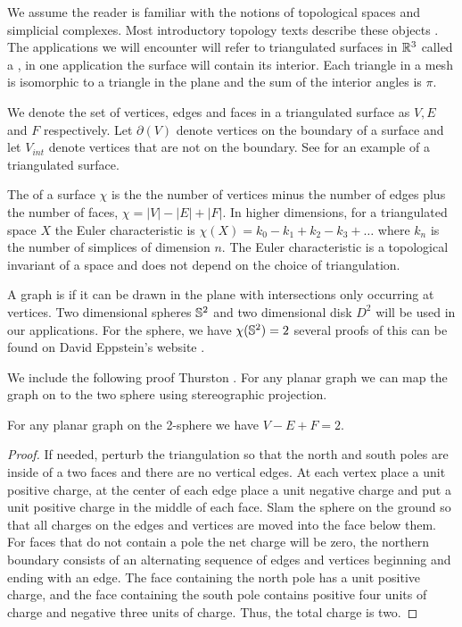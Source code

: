We assume the reader is familiar with the notions
of topological spaces and simplicial complexes.
Most introductory topology texts describe these objects \cite{jm08,munkres}.
The applications we will encounter will refer to triangulated surfaces in $\mathbb{R}^3$
called a , in one application the surface will contain its interior.
Each triangle in a mesh is isomorphic to a triangle in the plane and the sum
of the interior angles is $\pi$.


We denote the set of vertices, edges and faces in a triangulated surface as 
$V, E$ and $F$ respectively.
Let $\partial(V)$ denote vertices on the boundary of a surface and let $V_{int}$ 
denote vertices that are not on the boundary.
See  for an example of a triangulated surface.



The  of a surface $\chi$ is the 
the number of vertices minus the number of edges plus  the number of faces, $\chi=|V|-|E|+|F|.$
In higher dimensions, for a triangulated space $X$ the Euler characteristic is 
$\chi(X)=k_0-k_1+k_2-k_3+\ldots$ where $k_n$ is the number of simplices of dimension $n.$
The Euler characteristic is a topological invariant of a space
and does not depend on the choice of triangulation.

A  graph  is  if it can be drawn in the plane with intersections only occurring
at vertices.
Two dimensional spheres $\mathbb{S}^2$ and two dimensional disk $D^2$ 
will be used in our applications.
For the sphere, we have $\chi(\mathbb{S}^2)=2$ 
several proofs of this can be found on David Eppstein's website \cite{eppstein-proofs}.




We include the following proof Thurston \cite{thurston}. 
For any planar graph we can map the graph on to the two sphere using stereographic projection.
 

\begin{theorem}\label{thm:euler}
For any planar graph on the 2-sphere we have $V-E+F=2.$
\end{theorem}

\begin{proof}
If needed, perturb the triangulation so that the north and south poles are 
inside of a two faces and there are no vertical edges. At each vertex place a unit positive
charge, at the center of each edge place a unit negative charge and put a unit positive
charge in the middle of each face. Slam the sphere on the ground so that all charges
on the edges and vertices are moved into the face below them. For faces that do not contain a pole
the net charge will be zero, the northern boundary consists of an alternating sequence
of edges and vertices  beginning  and ending with an edge.
The face containing the north pole has a unit positive charge, and the face containing the south
pole contains positive four units of charge and negative three units of charge.
Thus, the total charge is two.

\end{proof}


